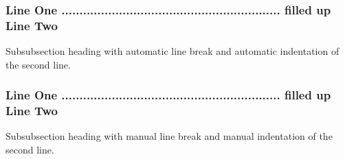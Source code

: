 \documentclass{snapshotmfo}
\begin{document}
\subsubsection[Line One ... filled up Line Two]{Line One ............................................................. filled up Line Two}
Subsubsection heading with automatic line break and automatic indentation of the second line.

\subsubsection[Line One ... filled up Line Two]{Line One ............................................................. filled up\\
\hspace{29.2pt}Line Two}
Subsubsection heading with manual line break and manual indentation of the second line.
\end{document}
